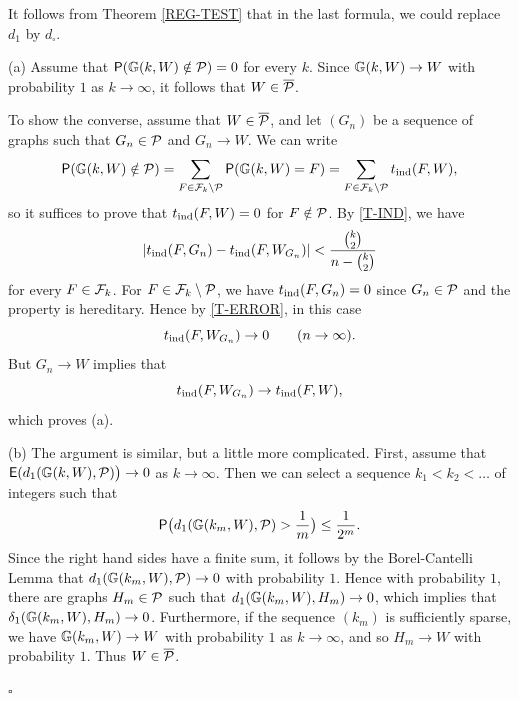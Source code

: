 \documentclass{article}
\newenvironment{proof}{\medskip\noindent{\bf Proof. }}{\hfill$\square$\medskip}
\begin{document}
\noindent It follows from Theorem \ref{REG-TEST} that in the last
formula, we could replace $d_1$ by $d_\square$.

\begin{proof}
(a) Assume that ${\sf P}({\mathbb G}(k,W)\notin\mathcal{P})=0$ for every $k$. Since
${\mathbb G}(k,W)\to W$ with probability $1$ as $k\to\infty$, it follows that
$W\in\overline{\mathcal{P}}$.

To show the converse, assume that $W\in\overline{\mathcal{P}}$, and let
$(G_n)$ be a sequence of graphs such that $G_n\in\mathcal{P}$ and $G_n\to W$.
We can write
\begin{equation}\label{PROB-P}
{\sf P}({\mathbb G}(k,W)\notin\mathcal{P}) = \sum_{F\in\mathcal{F}_k\setminus\mathcal{P}} {\sf P}({\mathbb G}(k,W)=F)
= \sum_{F\in\mathcal{F}_k\setminus\mathcal{P}} t_{\rm ind}(F,W),
\end{equation}
so it suffices to prove that $t_{\rm ind}(F,W)=0$ for $F\notin\mathcal{P}$. By
\eqref{T-IND}, we have
\begin{equation}\label{T-ERROR}
|t_{\rm ind}(F, G_n)-t_{\rm ind}(F,
W_{G_n})|<\frac{\binom{k}{2}}{n-\binom{k}{2}}
\end{equation}
for every $F\in\mathcal{F}_k$. For $F\in\mathcal{F}_k\setminus\mathcal{P}$, we have
$t_{\rm ind}(F, G_n)=0$ since $G_n\in\mathcal{P}$ and the property is hereditary.
Hence by \eqref{T-ERROR}, in this case
\[
t_{\rm ind}(F, W_{G_n}) \to 0\qquad (n\to\infty).
\]
But $G_n\to W$ implies that
\[
t_{\rm ind}(F, W_{G_n}) \to t_{\rm ind}(F, W),
\]
which proves (a).

\medskip

(b) The argument is similar, but a little more complicated. First,
assume that ${\sf E}(d_1({\mathbb G}(k,W),\mathcal{P})\bigr)\to 0$ as $k\to\infty$. Then
we can select a sequence $k_1<k_2<\dots$ of integers such that
\[
{\sf P}\bigl(d_1({\mathbb G}(k_m,W),\mathcal{P})>\frac1m\bigr) \le \frac1{2^m}.
\]
Since the right hand sides have a finite sum, it follows by the
Borel-Cantelli Lemma that $d_1({\mathbb G}(k_m,W),\mathcal{P})\to 0$ with probability
$1$. Hence with probability $1$, there are graphs $H_m\in\mathcal{P}$ such
that $d_1({\mathbb G}(k_m,W),H_m)\to 0$, which implies that
$\delta_1({\mathbb G}(k_m,W),H_m)\to 0$. Furthermore, if the sequence $(k_m)$
is sufficiently sparse, we have ${\mathbb G}(k_m,W)\to W$ with probability
$1$ as $k\to\infty$, and so $H_m\to W$ with probability $1$. Thus
$W\in\overline{\mathcal{P}}$.


\end{proof}
\end{document}
